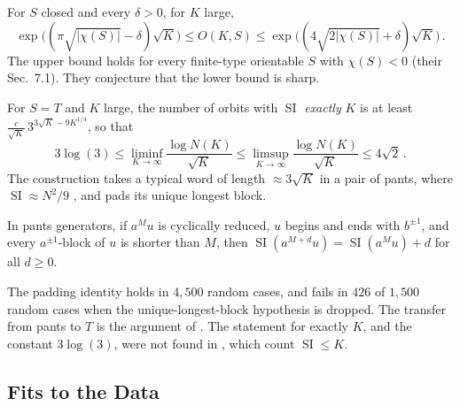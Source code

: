 \documentclass[10pt]{article}
\begin{document}
\begin{thm}
	For $S$ closed and every $\delta > 0$, for $K$ large,
	\[
		\exp\bigl((\pi\sqrt{|\chi(S)|} - \delta)\sqrt{K}\bigr) \leq O(K,S) \leq \exp\bigl((4\sqrt{2|\chi(S)|} + \delta)\sqrt{K}\bigr) \, .
	\]
	The upper bound holds for every finite-type orientable $S$ with $\chi(S) < 0$ (their Sec.\ 7.1).
	They conjecture that the lower bound is sharp.
\end{thm}

\begin{claim}
	For $S = T$ and $K$ large, the number of orbits with $\operatorname{SI}$ \emph{exactly} $K$ is at least $\frac{c}{\sqrt{K}}\, 3^{3\sqrt{K} - 9K^{1/4}}$, so that
	\[
		3\log(3) \leq \liminf_{K \to \infty} \frac{\log N(K)}{\sqrt{K}} \leq \limsup_{K \to \infty} \frac{\log N(K)}{\sqrt{K}} \leq 4\sqrt{2} \, .
	\]
	The construction takes a typical word of length $\approx 3\sqrt{K}$ in a pair of pants, where $\operatorname{SI} \approx N^2/9$ \citep{chaslalley12}, and pads its unique longest block.
\end{claim}

\begin{lem}
	In pants generators, if $a^M u$ is cyclically reduced, $u$ begins and ends with $b^{\pm 1}$, and every $a^{\pm 1}$-block of $u$ is shorter than $M$, then $\operatorname{SI}(a^{M+d} u) = \operatorname{SI}(a^M u) + d$ for all $d \geq 0$.
\end{lem}

\begin{rmk}[checks]
	The padding identity holds in $4{,}500$ random cases, and fails in $426$ of $1{,}500$ random cases when the unique-longest-block hypothesis is dropped.
	The transfer from pants to $T$ is the argument of \citet{sapir16}.
	The statement for exactly $K$, and the constant $3\log(3)$, were not found in \citet{sapir16,aougabsouto16}, which count $\operatorname{SI} \leq K$.
\end{rmk}


\subsection{Fits to the Data}
\end{document}
